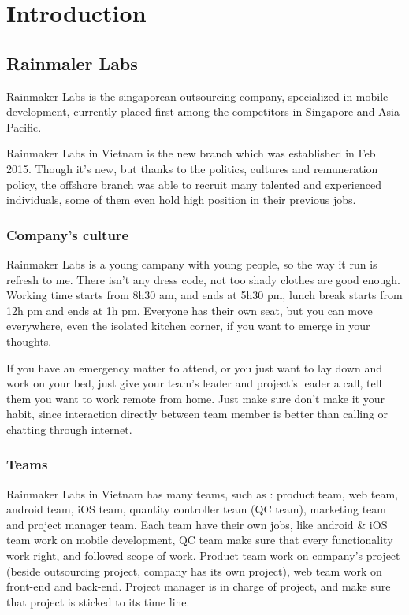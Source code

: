 \chapter{Introduction}
\section{Rainmaler Labs}

Rainmaker Labs is the singaporean outsourcing company, specialized in mobile development, currently placed first among the competitors in Singapore and Asia Pacific. 

Rainmaker Labs in Vietnam is the new branch which was established in Feb 2015. Though it's new, but thanks to the politics, cultures and remuneration policy, the offshore branch was able to recruit many talented and experienced individuals, some of them even hold high position in their previous jobs.

\subsection{Company's culture}
Rainmaker Labs is a young campany with young people, so the way it run is refresh to me. There isn't any dress code, not too shady clothes are good enough. Working time starts from 8h30 am, and ends at 5h30 pm, lunch break starts from 12h pm and ends at 1h pm. Everyone has their own seat, but you can move everywhere, even the isolated kitchen corner, if you want to emerge in your thoughts. 

If you have an emergency matter to attend, or you just want to lay down and work on your bed, just give your team's leader and project's leader a call, tell them you want to work remote from home. Just make sure don't make it your habit, since interaction directly between team member is better than calling or chatting through internet. 

\subsection{Teams}
Rainmaker Labs in Vietnam has many teams, such as : product team, web team, android team, iOS team, quantity controller team (QC team), marketing team and project manager team. Each team have their own jobs, like android \& iOS team work on mobile development, QC team make sure that every functionality work right, and followed scope of work. Product team work on company's project (beside outsourcing project, company has its own project), web team work on front-end and back-end. Project manager is in charge of project, and make sure that project is sticked to its time line.

